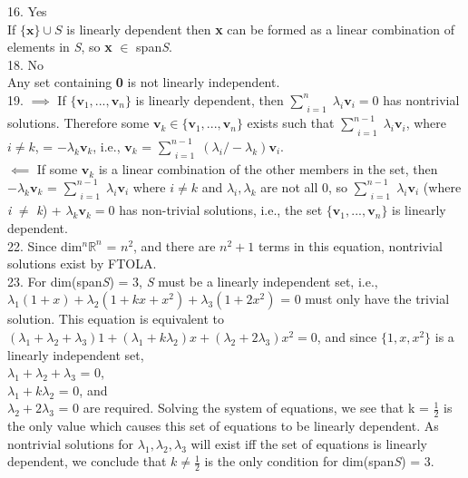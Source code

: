 \documentclass{article}
\begin{document}
    16. Yes\\
    If $\{\textbf{x}\} \cup S$ is linearly dependent then \textbf{x} can be formed as a linear combination of elements in \textit{S}, so \textbf{x} $\in$ span\textit{S}.\\

    18. No\\
    Any set containing \textbf{0} is not linearly independent.\\

    19. $\implies$ If $\{\textbf{v}_1, ..., \textbf{v}_n\}$ is linearly dependent, then $\sum_{\substack{i=1}}^{n} \lambda_i\textbf{v}_i = 0$ has nontrivial solutions. Therefore some $\textbf{v}_k \in \{\textbf{v}_1, ..., \textbf{v}_n\}$ exists such that $\sum_{\substack{i=1}}^{n-1} \lambda_i\textbf{v}_i$, where $i \neq k$, = $-\lambda_k\textbf{v}_k$, i.e., $\textbf{v}_k$ = $\sum_{\substack{i=1}}^{n-1} (\lambda_i/-\lambda_k)\textbf{v}_i.$\\
  $\impliedby$ If some $\textbf{v}_k$ is a linear combination of the other members in the set, then $-\lambda_k\textbf{v}_k$ = $\sum_{\substack{i=1}}^{n-1} \lambda_i\textbf{v}_i$ where $i \neq k$ and $\lambda_i, \lambda_k$ are not all 0, so $\sum_{\substack{i=1}}^{n-1} \lambda_i\textbf{v}_i$ (where \textit{i} $\neq$ \textit{k}) + $\lambda_k\textbf{v}_k = 0$ has non-trivial solutions, i.e., the set $\{\textbf{v}_1, ..., \textbf{v}_n\}$ is linearly dependent.\\

    22. Since dim$^n\mathbb{R}^{n}$ = $n^2$, and there are $n^2 + 1$ terms in this equation, nontrivial solutions exist by FTOLA.\\

    23. For dim(span\textit{S}) = 3, \textit{S} must be a linearly independent set, i.e., $\lambda_1(1 + x) + \lambda_2(1 + kx + x^2) + \lambda_3(1 + 2x^2)$ = 0 must only have the trivial solution. This equation is equivalent to $(\lambda_1 + \lambda_2 + \lambda_3)1 + (\lambda_1 + k\lambda_2)x + (\lambda_2 + 2\lambda_3)x^2 = 0$, and since $\{1, x, x^2\}$ is a linearly independent set,\\
  $\lambda_1 + \lambda_2 + \lambda_3$ = 0,\\
  $\lambda_1 + k\lambda_2$ = 0, and\\
  $\lambda_2 + 2\lambda_3$ = 0 are required. Solving the system of equations, we see that k = $\frac{1}{2}$ is the only value which causes this set of equations to be linearly dependent. As nontrivial solutions for $\lambda_1, \lambda_2, \lambda_3$ will exist iff the set of equations is linearly dependent, we conclude that $k \neq \frac{1}{2}$ is the only condition for dim(span\textit{S}) = 3.\\
\end{document}
